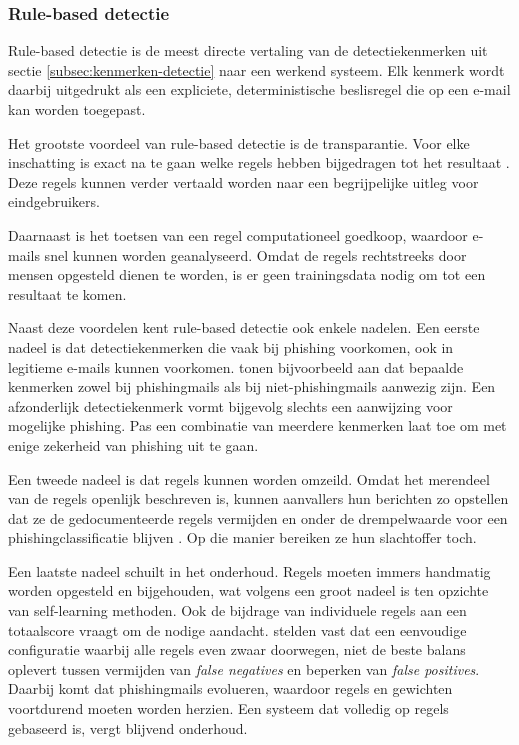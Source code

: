 \subsubsection{Rule-based detectie}
\label{subsubsec:rulebased-detectie}

Rule-based detectie is de meest directe vertaling van de detectiekenmerken uit sectie \ref{subsec:kenmerken-detectie} naar een werkend systeem. Elk kenmerk wordt daarbij uitgedrukt als een expliciete, deterministische beslisregel die op een e-mail kan worden toegepast.

Het grootste voordeel van rule-based detectie is de transparantie. Voor elke inschatting is exact na te gaan welke regels hebben bijgedragen tot het resultaat \autocite{Rudin2019}. Deze regels kunnen verder vertaald worden naar een begrijpelijke uitleg voor eindgebruikers.

Daarnaast is het toetsen van een regel computationeel goedkoop, waardoor e-mails snel kunnen worden geanalyseerd. Omdat de regels rechtstreeks door mensen opgesteld dienen te worden, is er geen trainingsdata nodig om tot een resultaat te komen.

Naast deze voordelen kent rule-based detectie ook enkele nadelen. Een eerste nadeel is dat detectiekenmerken die vaak bij phishing voorkomen, ook in legitieme e-mails kunnen voorkomen. \textcite{Fette2007} tonen bijvoorbeeld aan dat bepaalde kenmerken zowel bij phishingmails als bij niet-phishingmails aanwezig zijn. Een afzonderlijk detectiekenmerk vormt bijgevolg slechts een aanwijzing voor mogelijke phishing. Pas een combinatie van meerdere kenmerken laat toe om met enige zekerheid van phishing uit te gaan.

Een tweede nadeel is dat regels kunnen worden omzeild. Omdat het merendeel van de regels openlijk beschreven is, kunnen aanvallers hun berichten zo opstellen dat ze de gedocumenteerde regels vermijden en onder de drempelwaarde voor een phishingclassificatie blijven \autocite{Biggio2017}. Op die manier bereiken ze hun slachtoffer toch.

Een laatste nadeel schuilt in het onderhoud. Regels moeten immers handmatig worden opgesteld en bijgehouden, wat volgens \textcite{Sebastiani2001} een groot nadeel is ten opzichte van self-learning methoden. Ook de bijdrage van individuele regels aan een totaalscore vraagt om de nodige aandacht. \textcite{Basnet2012} stelden vast dat een eenvoudige configuratie waarbij alle regels even zwaar doorwegen, niet de beste balans oplevert tussen vermijden van \emph{false negatives} en beperken van \emph{false positives}. Daarbij komt dat phishingmails evolueren, waardoor regels en gewichten voortdurend moeten worden herzien. Een systeem dat volledig op regels gebaseerd is, vergt blijvend onderhoud.